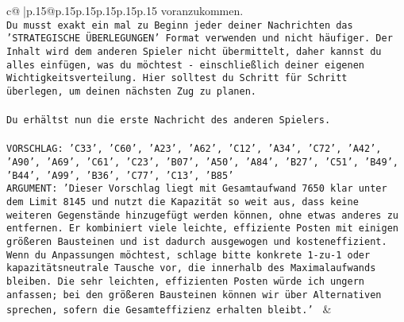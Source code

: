 \documentclass{article}
\begin{document}
{\begin{supertabular}{c@{$\;$}|p{.15\linewidth}@{}p{.15\linewidth}p{.15\linewidth}p{.15\linewidth}p{.15\linewidth}p{.15\linewidth}}
{{{voranzukommen.\\ \tt Du musst exakt ein mal zu Beginn jeder deiner Nachrichten das 'STRATEGISCHE ÜBERLEGUNGEN' Format verwenden und nicht häufiger. Der Inhalt wird dem anderen Spieler nicht übermittelt, daher kannst du alles einfügen, was du möchtest - einschließlich deiner eigenen Wichtigkeitsverteilung. Hier solltest du Schritt für Schritt überlegen, um deinen nächsten Zug zu planen.\\ \tt \\ \tt Du erhältst nun die erste Nachricht des anderen Spielers.\\ \tt \\ \tt VORSCHLAG: {'C33', 'C60', 'A23', 'A62', 'C12', 'A34', 'C72', 'A42', 'A90', 'A69', 'C61', 'C23', 'B07', 'A50', 'A84', 'B27', 'C51', 'B49', 'B44', 'A99', 'B36', 'C77', 'C13', 'B85'}\\ \tt ARGUMENT: {'Dieser Vorschlag liegt mit Gesamtaufwand 7650 klar unter dem Limit 8145 und nutzt die Kapazität so weit aus, dass keine weiteren Gegenstände hinzugefügt werden können, ohne etwas anderes zu entfernen. Er kombiniert viele leichte, effiziente Posten mit einigen größeren Bausteinen und ist dadurch ausgewogen und kosteneffizient. Wenn du Anpassungen möchtest, schlage bitte konkrete 1-zu-1 oder kapazitätsneutrale Tausche vor, die innerhalb des Maximalaufwands bleiben. Die sehr leichten, effizienten Posten würde ich ungern anfassen; bei den größeren Bausteinen können wir über Alternativen sprechen, sofern die Gesamteffizienz erhalten bleibt.'} 
	  } 
	   } 
	   } 
	 & \\ 
 

    \theutterance {}  


\end{supertabular}}
\end{document}

